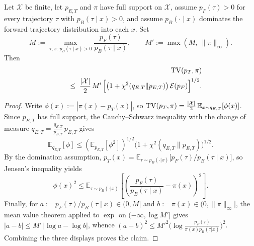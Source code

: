 \begin{proposition}\label{prop:silva_explicit}
Let $\mathcal X$ be finite, let $p_{E,T}$ and $\pi$ have full support on $\mathcal X$, assume $p_F(\tau)>0$ for every trajectory $\tau$ with $p_B(\tau\mid x)>0$, and assume $p_B(\cdot\mid x)$ dominates the forward trajectory distribution into each $x$. Set
\begin{equation}
    M := \max_{\tau,x:\,p_B(\tau\mid x)>0} \frac{p_F(\tau)}{p_B(\tau\mid x)}, \qquad M' := \max\left(M,\ \|\pi\|_{\infty}\right).
\end{equation}
Then
\begin{eqnarray}
&&\mathrm{TV}(p_T,\pi) \nonumber\\ &&\;\; \leq\; \frac{|\mathcal X|}{2}\, M'\,
\Bigl[\bigl(1+\chi^2(q_{E,T}\|p_{E,T})\bigr)\,\mathcal E(p_F)\Bigr]^{1/2}.
\end{eqnarray}
\end{proposition}
\begin{proof}
Write $\phi(x) := |\pi(x)-p_T(x)|$, so $\mathrm{TV}(p_T,\pi) = \frac{|\mathcal X|}{2}\,\mathbb E_{x\sim q_{E,T}}[\phi(x)]$. Since $p_{E,T}$ has full support, the Cauchy--Schwarz inequality with the change of measure $q_{E,T} = \frac{q_{E,T}}{p_{E,T}}\,p_{E,T}$ gives
\begin{equation}
    \mathbb E_{q_{E,T}}[\phi] \leq \left(\mathbb E_{p_{E,T}}[\phi^2]\right)^{1/2}\bigl(1+\chi^2(q_{E,T}\|p_{E,T})\bigr)^{1/2}.
\end{equation}
By the domination assumption, $p_T(x) = \mathbb E_{\tau\sim p_B(\cdot|x)}\bigl[p_F(\tau)/p_B(\tau\mid x)\bigr]$, so Jensen's inequality yields
\begin{equation}
    \phi(x)^2 \leq \mathbb E_{\tau\sim p_B(\cdot|x)}\left[\left(\frac{p_F(\tau)}{p_B(\tau\mid x)} - \pi(x)\right)^{\!2}\right].
\end{equation}
Finally, for $a := p_F(\tau)/p_B(\tau\mid x) \in (0, M]$ and $b := \pi(x)\in(0,\|\pi\|_\infty]$, the mean value theorem applied to $\exp$ on $(-\infty, \log M']$ gives $|a-b| \leq M'\,|\log a - \log b|$, whence $(a-b)^2 \leq M'^2\bigl(\log\frac{p_F(\tau)}{\pi(x)p_B(\tau|x)}\bigr)^2$. Combining the three displays proves the claim.
\end{proof}

